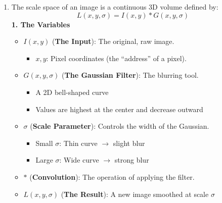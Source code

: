 \documentclass[12pt]{article}
\begin{document}
\begin{enumerate}
    \item The scale space of an image is a continuous 3D volume defined by:
          \[
              L(x,y,\sigma) = I(x,y) * G(x,y,\sigma)
          \]
          \textbf{1. The Variables}
          \begin{itemize}
              \item $I(x,y)$ (\textbf{The Input}): The original, raw image.
                    \begin{itemize}
                        \item $x, y$: Pixel coordinates (the ``address'' of a pixel).
                    \end{itemize}

              \item $G(x,y,\sigma)$ (\textbf{The Gaussian Filter}): The blurring tool.
                    \begin{itemize}
                        \item A 2D bell-shaped curve
                        \item Values are highest at the center and decrease outward
                    \end{itemize}

              \item $\sigma$ (\textbf{Scale Parameter}): Controls the width of the Gaussian.
                    \begin{itemize}
                        \item Small $\sigma$: Thin curve $\rightarrow$ slight blur
                        \item Large $\sigma$: Wide curve $\rightarrow$ strong blur
                    \end{itemize}

              \item $*$ (\textbf{Convolution}): The operation of applying the filter.
              \item $L(x,y,\sigma)$ (\textbf{The Result}): A new image smoothed at scale $\sigma$
          \end{itemize}



\end{enumerate}
\end{document}

